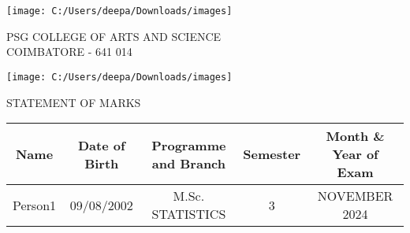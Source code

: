 \documentclass[12pt]{report}
\begin{document}
	\noindent
	\begin{minipage}[1]{0.08\textwidth}
		\texttt{[image: C:/Users/deepa/Downloads/images]}
	\end{minipage}
	\noindent
	\begin{minipage}[1]{0.75\textwidth}
		\begin{center}
			{\large PSG COLLEGE OF ARTS AND SCIENCE \\ COIMBATORE - 641 014}
		\end{center}
	\end{minipage}
	\noindent
	\begin{minipage}[1]{0.08\textwidth}
		\texttt{[image: C:/Users/deepa/Downloads/images]}
	\end{minipage}
	\begin{center}
		\Large STATEMENT OF MARKS
	\end{center}
	\begin{table}[h]
		\renewcommand{\arraystretch}{1.5}
		\begin{center}
			\begin{tabular}{|c|c|c|c|c|}\hline
				Name & Date of Birth & Programme and Branch & Semester &
				
				Month \& Year of Exam \\ \hline
				
				Person1 & 09/08/2002 & M.Sc. STATISTICS & 3 & NOVEMBER 2024
				
				\\ \hline
				
			\end{tabular}
		\end{center}
	\end{table}
\end{document}
